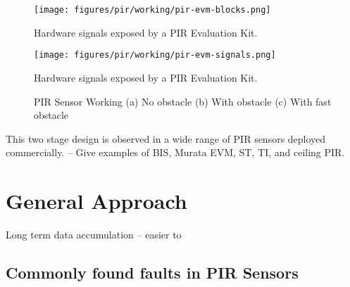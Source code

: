 \begin{figure}
\centering
\texttt{[image: figures/pir/working/pir-evm-blocks.png]}
\caption{Hardware signals exposed by a PIR Evaluation Kit.}
\label{fig:pir_sensor_evm}
\end{figure}

\begin{figure}
\centering
\texttt{[image: figures/pir/working/pir-evm-signals.png]}
\caption{Hardware signals exposed by a PIR Evaluation Kit.}
\label{fig:pir_sensor_evm}
\end{figure}

\begin{figure*}
	\centering
	\caption{PIR Sensor Working (a) No obstacle (b) With obstacle (c) With fast obstacle}
	\label{fig:PIR-sensor-working}
\end{figure*}




This two stage design is observed in a wide range of PIR sensors deployed  commercially. -- Give examples of BIS, Murata EVM, ST, TI, and ceiling PIR.

\section{General Approach} 

Long term data accumulation -- easier to 

\subsection{Commonly found faults in PIR Sensors}

